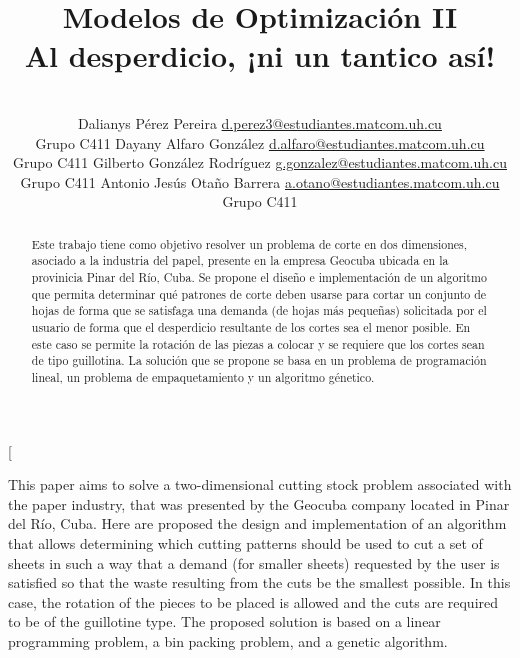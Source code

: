 \documentclass[a4paper,10pt,twocolumn]{article}
\title{Modelos de Optimización II \\
	Al desperdicio, ¡ni un tantico así!}
\author{\\
\name Dalianys Pérez Pereira \email \href{mailto:d.perez3@estudiantes.matcom.uh.cu}{d.perez3@estudiantes.matcom.uh.cu}
	\\ \addr Grupo C411 \AND
\name Dayany Alfaro González \email \href{mailto:d.alfaro@estudiantes.matcom.uh.cu}{d.alfaro@estudiantes.matcom.uh.cu}
  \\ \addr Grupo C411 \AND
\name Gilberto González Rodríguez \email \href{mailto:mailto:g.gonzalez@estudiantes.matcom.uh.cu}{g.gonzalez@estudiantes.matcom.uh.cu}
\\ \addr Grupo C411 \AND
\name Antonio Jesús Otaño Barrera \email \href{mailto:a.otano@estudiantes.matcom.uh.cu}{a.otano@estudiantes.matcom.uh.cu}
\\ \addr Grupo C411}
\begin{document}
\twocolumn[

\maketitle


\begin{abstract}

Este trabajo tiene como objetivo resolver un problema de corte en dos dimensiones, asociado a la industria del papel, presente en la empresa Geocuba ubicada en la provinicia Pinar del Río, Cuba. Se propone el  diseño e implementación de un algoritmo que permita determinar qué patrones de corte deben usarse para cortar un conjunto de hojas de forma que se satisfaga una demanda (de hojas más pequeñas) solicitada por el usuario de forma que el desperdicio resultante de los cortes sea el menor posible. En este caso se permite la rotación de las piezas a colocar y se requiere que los cortes sean de tipo guillotina. La solución que se propone se basa en un problema de programación lineal, un problema de empaquetamiento y un algoritmo génetico.

\end{abstract}

\vspace{0.5cm}

\begin{enabstract}

This paper aims to solve a two-dimensional cutting stock problem associated with the paper industry, that was presented by the Geocuba company located in Pinar del Río, Cuba. Here are proposed the design and implementation of an algorithm that allows determining which cutting patterns should be used to cut a set of sheets in such a way that a demand (for smaller sheets) requested by the user is satisfied so that the waste resulting from the cuts be the smallest possible. In this case, the rotation of the pieces to be placed is allowed and the cuts are required to be of the guillotine type. The proposed solution is based on a linear programming problem, a bin packing problem, and a genetic algorithm. 

\end{enabstract}
\end{document}
